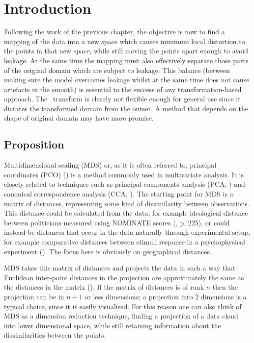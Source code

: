 \label{chap-mds}
\section{Introduction}

Following the work of the previous chapter, the objective is now to find a mapping of the data into a new space which causes minimum local distortion to the points in that new space, while still moving the points apart enough to avoid leakage. At the same time the mapping must also effectively separate those parts of the original domain which are subject to leakage. This balance (between making sure the model overcomes leakage whilst at the same time does not cause artefacts in the smooth) is essential to the success of any transformation-based approach. The \sch\ transform is clearly not flexible enough for general use since it dictates the transformed domain from the outset. A method that depends on the shape of original domain may have more promise.

\subsection{Proposition}

Multidimensional scaling (MDS) or, as it is often referred to, principal coordinates (PCO) (\cite{gower1966}) is a method commonly used in multivariate analysis. It is closely related to techniques such as principal components analysis (PCA, \cite[p. 200]{chatfieldcollins}) and canonical correspondence analysis (CCA, \cite{terbraak}). The starting point for MDS is a matrix of distances, representing some kind of dissimilarity between observations. This distance could be calculated from the data, for example ideological distance between politicians measured using NOMINATE scores (\cite{quantss}, p. 225), or could instead be distances that occur in the data naturally through experimental setup,  for example comparative distances between stimuli response in a psychophysical experiment (\cite{torgerson}). The focus here is obviously on geographical distances.

MDS takes this matrix of distances and projects the data in such a way that Euclidean inter-point distances in the projection are approximately the same as the distances in the matrix (\cite[p. 187]{chatfieldcollins}). If the matrix of distances is of rank $n$ then the projection can be in $n-1$ or less dimensions; a projection into 2 dimensions is a typical choice, since it is easily visualised. For this reason one can also think of MDS as a dimension reduction technique, finding a projection of a data cloud into lower dimensional space, while still retaining information about the dissimilarities between the points.

